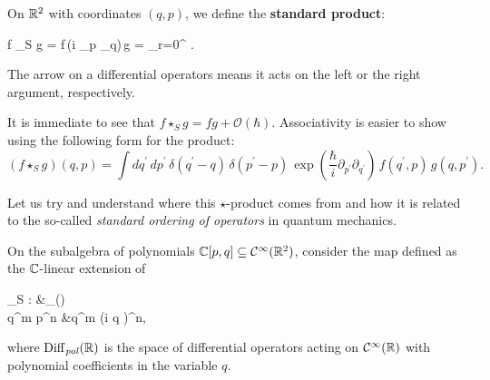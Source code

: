\begin{example}
\label{ex:standard_star_product}
	On $\mathbb{R}^2$ with coordinates $(q,p)$, we define the \textbf{standard product}:
	\begin{eqalign}
		f \star_S g = f\,\exp\left(\frac{\planck}i \lpartial_p \rpartial_q\right)\,g = \sum_{r=0}^\infty {}\,\,.
	\end{eqalign}
	The arrow on a differential operators means it acts on the left or the right argument, respectively.


	It is immediate to see that $f\star_S g=fg+\mathcal{O}(\hbar)$.
	Associativity is easier to show using the following form for the product:
	\begin{equation}
		(f\star_S g)(q,p)=\int dq^\prime\, dp^\prime\, \delta(q^\prime-q)\,\delta(p^\prime-p)\,\exp\left(\frac{\hbar}{i}\partial_{p^\prime}\partial_{q^\prime}\right)\,f(q^\prime,p)\,g(q,p^\prime).
	\end{equation}


	Let us try and understand where this $\star$-product comes from and how it is related to the so-called \emph{standard ordering of operators} in quantum mechanics.

	On the subalgebra of polynomials $\mathbb{C}[p,q] \subseteq \mathcal{C}^\infty(\mathbb{R}^2)$, consider the map defined as the $\mathbb{C}$-linear extension of
	\begin{eqalign}
		\rho_S : \C[p,q] &\longto \Diff_{}(\R)\\
		q^m p^n &\longmapsto q^m \left(\frac{\planck}i \pder{}q \right)^n,
	\end{eqalign}
	where $\mathrm{Diff}_{\mathit{pol}}(\mathbb{R})$ is the space of differential operators acting on $\mathcal{C}^\infty(\mathbb{R})$ with polynomial
	coefficients in the variable $q$.


\end{example}
